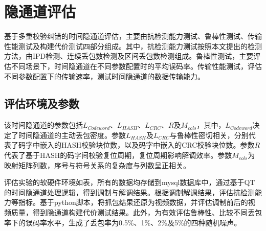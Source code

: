 \section{隐通道评估}
\label{chap:hash:result}

基于多重校验纠错的时间隐通道评估，主要由抗检测能力测试、鲁棒性测试、传输性能测试及构建代价测试四部分组成。其中，抗检测能力测试按照本文提出的检测方法，由IPD检测、连续丢包数检测及区间丢包数检测组成。鲁棒性测试，主要评估不同场景下，时间隐通道在不同参数配置时的平均误码率。传输性能测试，评估不同参数配置下的传输速率，测试时间隐通道的数据传输能力。

\subsection{评估环境及参数}
\label{chap:hash:result:parameters}

该时间隐通道的参数包括$L_{Codeword}$、$L_{HASH}$、$L_{CRC}$、$R$及$M_{cols}$，其中，$L_{Codeword}$决定了时间隐通道的主动丢包密度。参数$L_{HASH}$及$L_{CRC}$与鲁棒性密切相关，分别代表了码字中嵌入的HASH校验块位数，以及码字中嵌入的CRC校验块位数。参数$R$代表了基于HASH的码字间校验复位周期，复位周期影响解调效率。参数$M_{cols}$为映射矩阵列数，序号与符号关系的复杂度与列数呈正相关。


评估实验的软硬件环境如表，所有的数据均存储到mysql数据库中，通过基于QT的时间隐通道处理逻辑，得到调制与解调结果。根据调制解调结果，评估抗检测能力等指标。基于python脚本，将抓包结果还原为视频数据，并评估调制前后的视频质量，得到隐通道构建代价测试结果。此外，为有效评估鲁棒性、比较不同丢包率下的误码率水平，生成了丢包率为0.5\%、1\%、2\%及5\%的四种随机噪声。

